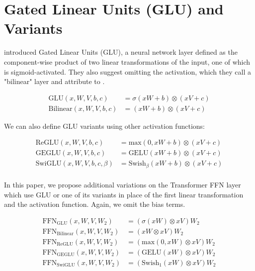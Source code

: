\documentclass{article}
\begin{document}
\section{Gated Linear Units (GLU) and Variants}

\citep{dauphin2016} introduced Gated Linear Units (GLU), a neural network layer defined as the component-wise product of two linear transformations of the input, one of which is sigmoid-activated.  They also suggest omitting the activation, which they call a "bilinear" layer and attribute to \citep{mnih2007three}.

\begin{equation}
\begin{split}
\textrm{GLU}(x, W, V, b, c) & = \sigma(xW + b) \otimes (xV + c) \\
\textrm{Bilinear}(x, W, V, b, c) & = (xW + b) \otimes (xV + c)
\end{split}
\end{equation}

We can also define GLU variants using other activation functions:

\begin{equation}
\begin{split}
\textrm{ReGLU}(x, W, V, b, c) & = \textrm{max}(0, xW + b) \otimes (xV + c) \\
\textrm{GEGLU}(x, W, V, b, c) & = \textrm{GELU}(xW + b) \otimes (xV + c) \\
\textrm{SwiGLU}(x, W, V, b, c, \beta) & = \textrm{Swish}_\beta(xW + b) \otimes (xV + c) \\
\end{split}
\end{equation}

In this paper, we propose additional variations on the Transformer FFN layer which use GLU or one of its variants in place of the first linear transformation and the activation function.  Again, we omit the bias terms.

\begin{equation}
\begin{split}
\textrm{FFN}_\textrm{GLU}(x, W, V, W_2) & = (\sigma(xW) \otimes xV)W_2 \\
\textrm{FFN}_\textrm{Bilinear}(x, W, V, W_2) & = (xW \otimes xV)W_2 \\
\textrm{FFN}_\textrm{ReGLU}(x, W, V, W_2) & = (\textrm{max}(0, xW) \otimes xV)W_2 \\
\textrm{FFN}_\textrm{GEGLU}(x, W, V, W_2) & = (\textrm{GELU}(xW) \otimes xV)W_2 \\
\textrm{FFN}_\textrm{SwiGLU}(x, W, V, W_2) & = (\textrm{Swish}_1(xW) \otimes xV)W_2 \\
\end{split}
\end{equation}
\end{document}
